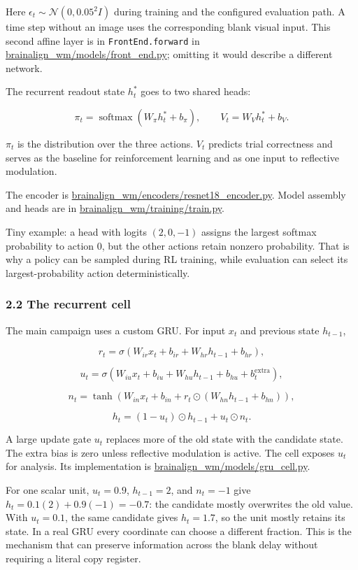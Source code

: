 \documentclass[
  10pt,
]{article}
\begin{document}
Here \(\epsilon_t\sim\mathcal N(0,0.05^2I)\) during training and the
configured evaluation path. A time step without an image uses the
corresponding blank visual input. This second affine layer is in
\texttt{FrontEnd.forward} in \url{brainalign_wm/models/front_end.py};
omitting it would describe a different network.

The recurrent readout state \(h_t^\ast\) goes to two shared heads:

\[
\pi_t=\operatorname{softmax}(W_\pi h_t^\ast+b_\pi),
\qquad
V_t=W_Vh_t^\ast+b_V.
\]

\(\pi_t\) is the distribution over the three actions. \(V_t\) predicts
trial correctness and serves as the baseline for reinforcement learning
and as one input to reflective modulation.

The encoder is \url{brainalign_wm/encoders/resnet18_encoder.py}. Model
assembly and heads are in \url{brainalign_wm/training/train.py}.

Tiny example: a head with logits \((2,0,-1)\) assigns the largest
softmax probability to action 0, but the other actions retain nonzero
probability. That is why a policy can be sampled during RL training,
while evaluation can select its largest-probability action
deterministically.

\hypertarget{the-recurrent-cell}{%
\subsubsection{2.2 The recurrent cell}\label{the-recurrent-cell}}

The main campaign uses a custom GRU. For input \(x_t\) and previous
state \(h_{t-1}\),

\[
r_t=\sigma(W_{ir}x_t+b_{ir}+W_{hr}h_{t-1}+b_{hr}),
\]

\[
u_t=\sigma(W_{iu}x_t+b_{iu}+W_{hu}h_{t-1}+b_{hu}+b_t^{\mathrm{extra}}),
\]

\[
n_t=\tanh(W_{in}x_t+b_{in}+r_t\odot(W_{hn}h_{t-1}+b_{hn})),
\]

\[
h_t=(1-u_t)\odot h_{t-1}+u_t\odot n_t.
\]

A large update gate \(u_t\) replaces more of the old state with the
candidate state. The extra bias is zero unless reflective modulation is
active. The cell exposes \(u_t\) for analysis. Its implementation is
\url{brainalign_wm/models/gru_cell.py}.

For one scalar unit, \(u_t=0.9\), \(h_{t-1}=2\), and \(n_t=-1\) give
\(h_t=0.1(2)+0.9(-1)=-0.7\): the candidate mostly overwrites the old
value. With \(u_t=0.1\), the same candidate gives \(h_t=1.7\), so the
unit mostly retains its state. In a real GRU every coordinate can choose
a different fraction. This is the mechanism that can preserve
information across the blank delay without requiring a literal copy
register.
\end{document}
